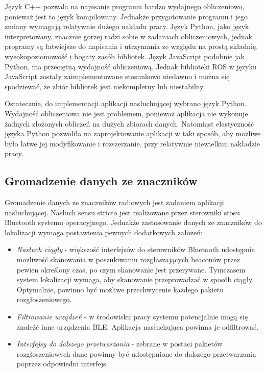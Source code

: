 Język C++ pozwala na napisanie programu bardzo wydajnego obliczeniowo, ponieważ jest to język kompilowany. Jednakże przygotowanie programu i jego zmiany wymagają relatywnie dużego nakładu pracy. 
Język Python, jako język interpretowany, znacznie gorzej radzi sobie w zadaniach obliczeniowych, jednak programy są łatwiejsze do napisania i utrzymania ze względu na prostą składnię, wysokopoziomowość i bogaty zasób bibliotek. Język JavaScript podobnie jak Python, ma przeciętną wydajność obliczeniową. Jednak biblioteki ROS w języku JavaScript zostały zaimplementowane stosunkowo niedawno i można się spodziewać, że zbiór bibliotek jest niekompletny lub niestabilny. 

Ostatecznie, do implementacji aplikacji nasłuchującej wybrano język Python. Wydajność obliczeniowa nie jest problemem, ponieważ aplikacja nie wykonuje żadnych złożonych obliczeń na dużych zbiorach danych. Natomiast elastyczność języka Python pozwoliła na zaprojektowanie aplikacji w taki sposób, aby możliwe było łatwe jej modyfikowanie i rozszerzanie, przy relatywnie niewielkim nakładzie pracy. 


\subsection{Gromadzenie danych ze znaczników}
Gromadzenie danych ze znaczników radiowych jest zadaniem aplikacji nasłuchującej. Nasłuch sensu stricto jest realizowane przez sterowniki stosu Bluetooth systemu operacyjnego. Jednakże zastosowanie danych ze znaczników do lokalizacji wymaga postawienia pewnych dodatkowych założeń:
\begin{itemize}
 \item \textit{Nasłuch ciągły} - większość interfejsów do sterowników Bluetooth udostępnia możliwość skanowania w poszukiwaniu rozgłaszających beaconów przez pewien określony czas, po czym skanowanie jest przerywane. Tymczasem system lokalizacji wymaga, aby skanowanie przeprowadzać w sposób ciągły. Optymalnie, powinno być możliwe przechwycenie każdego pakietu rozgłoszeniowego.
 \item \textit{Filtrowanie urządzeń} -  w środowisku pracy systemu potencjalnie mogą się znaleźć inne urządzenia BLE. Aplikacja nasłuchująca powinna je odfiltrować.
 \item \textit{Interfejsy do dalszego przetwarzania} - zebrane w postaci pakietów rozgłoszeniowych dane powinny być udostępnione do dalszego przetwarzania poprzez odpowiedni interfejs.
\end{itemize}

